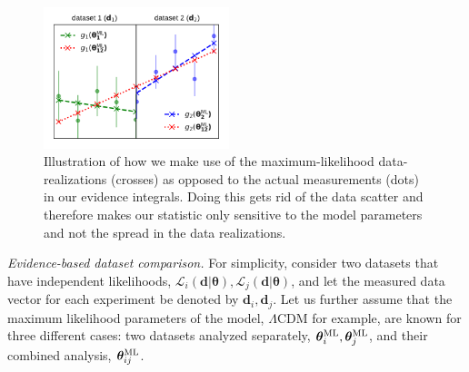 \documentclass[amsmath, amssymb, reprint, aps]{revtex4-1}
\newcommand{\dv}{\textbf{d}}
\newcommand{\tv}{\bm{\theta}}
\newcommand{\tML}{\tv^{\rm ML}}
\begin{document}
    \begin{figure}
        \includegraphics[width=0.48\textwidth]{gtheta_new2.pdf}
        \caption{Illustration of how we make use of the maximum-likelihood data-realizations (crosses) as opposed to the actual measurements (dots) in our evidence integrals. Doing this gets rid of the data scatter and therefore makes our statistic only sensitive to the model parameters and not the spread in the data realizations.}
        \label{fig:gtheta}
    \end{figure}
    
    \medskip
    \textit{Evidence-based dataset comparison.}
    For simplicity, consider two datasets that have independent likelihoods, $\mathcal{L}_i(\dv|\tv), \mathcal{L}_j(\dv|\tv)$, and let the measured data vector for each experiment be denoted by $\dv_i, \dv_j$. Let us further assume that the maximum likelihood parameters of the model, $\Lambda$CDM for example, are known for three different cases: two datasets analyzed separately, $\tML_i, \tML_j$, and their combined analysis, $\tML_{ij}$.
    
\end{document}
